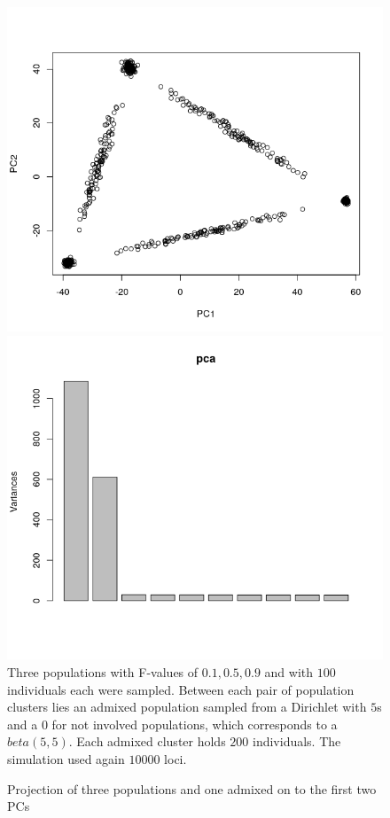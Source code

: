 \documentclass[a4paper, 11pt]{article}
\begin{document}
\begin{figure}[h!]
\caption{Projection of three populations and one admixed on to the first two PCs}
\includegraphics[scale=0.47]{Rplot_admixed_simplex}
\includegraphics[scale=0.45]{Rplot_eigenvalues_simplex}
Three populations with F-values  of $0.1, 0.5, 0.9$ and with $100$ individuals each were sampled. Between each pair of population clusters lies an admixed population sampled from a Dirichlet with $5$s and a $0$ for not involved populations, which corresponds to a $beta(5, 5)$. Each admixed cluster holds $200$ individuals. The simulation used again $10000$ loci.
\end{figure}
\end{document}
